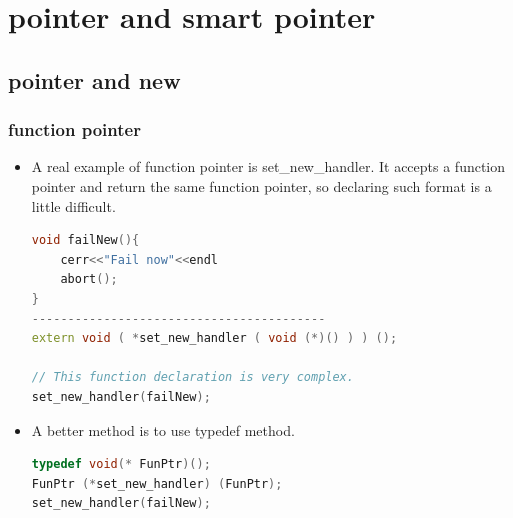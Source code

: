\documentclass[a4paper,11pt,twoside]{book}
\begin{document}
\chapter{pointer and smart pointer}

\section{pointer and new}
\subsection{function pointer}
\begin{itemize}  

\item A real example of function pointer is set\_new\_handler. It accepts a function pointer and return the same function pointer, so declaring such format is a little difficult.
\begin{lstlisting}[frame=single, language=c++]
void failNew(){
	cerr<<"Fail now"<<endl
	abort();
}
-----------------------------------------
extern void ( *set_new_handler ( void (*)() ) ) ();

// This function declaration is very complex.
set_new_handler(failNew);
\end{lstlisting}

\item A better method is to use typedef method.

\begin{lstlisting}[frame=single, language=c++]
typedef void(* FunPtr)();
FunPtr (*set_new_handler) (FunPtr);
set_new_handler(failNew);
\end{lstlisting}

\end{itemize}
\end{document}
